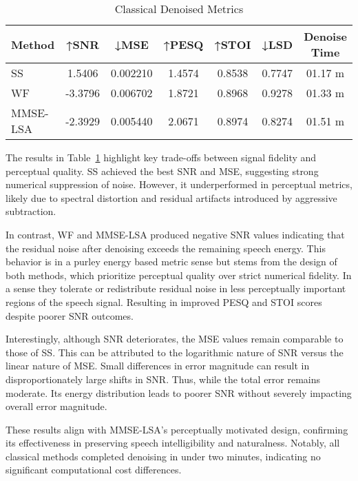 \vspace{1em}
\begin{table}[H]
\centering
\caption{Classical Denoised Metrics}
\label{tab:classical_metrics}
\begin{tabular}{|l|c|c|c|c|c|c|}
\hline
\textbf{Method} & \textbf{↑SNR} & \textbf{↓MSE} & \textbf{↑PESQ} & \textbf{↑STOI} & \textbf{↓LSD} & \textbf{Denoise Time} \\
\hline
SS          & 1.5406 & 0.002210 & 1.4574 & 0.8538 & 0.7747 & 01.17 m \\
WF          & -3.3796 & 0.006702 & 1.8721 & 0.8968 & 0.9278 & 01.33 m \\
MMSE-LSA    & -2.3929 & 0.005440 & 2.0671 & 0.8974 & 0.8274 & 01.51 m \\
\hline
\end{tabular}
\end{table}


The results in Table~\ref{tab:classical_metrics} highlight key trade-offs between signal fidelity and perceptual quality. SS achieved the best SNR and MSE, suggesting strong numerical suppression of noise. However, it underperformed in perceptual metrics, likely due to spectral distortion and residual artifacts introduced by aggressive subtraction.

In contrast, WF and MMSE-LSA produced negative SNR values indicating that the residual noise after denoising exceeds the remaining speech energy. This behavior is in a purley energy based metric sense but stems from the design of both methods, which prioritize perceptual quality over strict numerical fidelity. In a sense they tolerate or redistribute residual noise in less perceptually important regions of the speech signal. Resulting in improved PESQ and STOI scores despite poorer SNR outcomes. 

Interestingly, although SNR deteriorates, the MSE values remain comparable to those of SS. This can be attributed to the logarithmic nature of SNR versus the linear nature of MSE. Small differences in error magnitude can result in disproportionately large shifts in SNR. Thus, while the total error remains moderate. Its energy distribution leads to poorer SNR without severely impacting overall error magnitude.

These results align with MMSE-LSA's perceptually motivated design, confirming its effectiveness in preserving speech intelligibility and naturalness. Notably, all classical methods completed denoising in under two minutes, indicating no significant computational cost differences.

